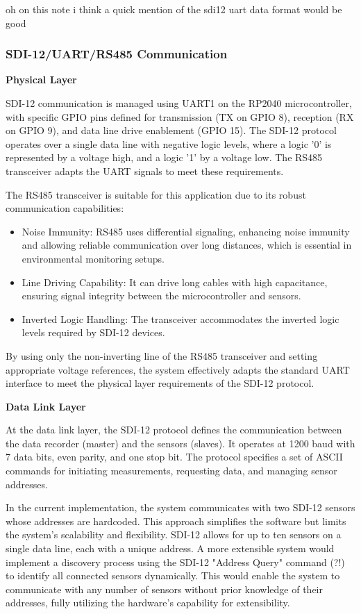 oh on this note i think a quick mention of the sdi12 uart data format would be good

\subsubsection{SDI-12/UART/RS485 Communication}

\textbf{Physical Layer}

SDI-12 communication is managed using UART1 on the RP2040 microcontroller, with specific 
GPIO pins defined for transmission (TX on GPIO 8), reception (RX on GPIO 9), and data 
line drive enablement (GPIO 15). The SDI-12 protocol operates over a single data line 
with negative logic levels, where a logic '0' is represented by a voltage high, and a 
logic '1' by a voltage low. The RS485 transceiver adapts the UART signals to meet these requirements.

The RS485 transceiver is suitable for this application due to its robust communication capabilities:

\begin{itemize}
    \item Noise Immunity: RS485 uses differential signaling, enhancing noise immunity and allowing 
    reliable communication over long distances, which is essential in environmental monitoring setups.
    \item Line Driving Capability: It can drive long cables with high capacitance, ensuring signal 
    integrity between the microcontroller and sensors.
    \item Inverted Logic Handling: The transceiver accommodates the inverted logic levels required by SDI-12 devices.
\end{itemize}

By using only the non-inverting line of the RS485 transceiver and setting appropriate voltage references, 
the system effectively adapts the standard UART interface to meet the physical layer requirements of the SDI-12 protocol.

\textbf{Data Link Layer}

At the data link layer, the SDI-12 protocol defines the communication between the data recorder 
(master) and the sensors (slaves). It operates at 1200 baud with 7 data bits, even parity, and one 
stop bit. The protocol specifies a set of ASCII commands for initiating measurements, requesting 
data, and managing sensor addresses.

In the current implementation, the system communicates with two SDI-12 sensors whose addresses are 
hardcoded. This approach simplifies the software but limits the system's scalability and flexibility. 
SDI-12 allows for up to ten sensors on a single data line, each with a unique address. A more extensible 
system would implement a discovery process using the SDI-12 "Address Query" command (?!) to identify 
all connected sensors dynamically. This would enable the system to communicate with any number of sensors 
without prior knowledge of their addresses, fully utilizing the hardware's capability for extensibility.

